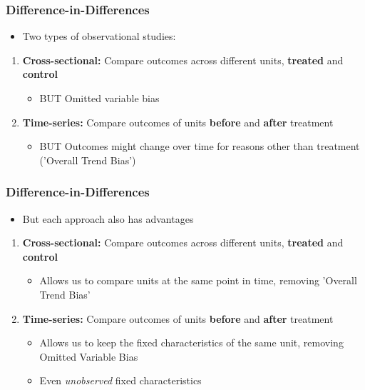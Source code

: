 \documentclass[xcolor=x11names,compress]{beamer}\usepackage[]{graphicx}\usepackage[]{color}
\renewcommand{\(}{\begin{columns}}
\renewcommand{\)}{\end{columns}}
\newcommand{\<}[1]{\begin{column}{#1}}
\renewcommand{\>}{\end{column}}
\begin{document}
\begin{frame}
\frametitle{Difference-in-Differences}
\begin{itemize}
\item Two types of observational studies:
\end{itemize}
\pause
\begin{enumerate}
\item \textbf{Cross-sectional:} Compare outcomes across different units, \textbf{treated} and \textbf{control}
\pause
\begin{itemize}
\item BUT Omitted variable bias
\end{itemize}
\pause
\item \textbf{Time-series:} Compare outcomes of units \textbf{before} and \textbf{after} treatment
\pause
\begin{itemize}
\item BUT Outcomes might change over time for reasons other than treatment ('Overall Trend Bias')
\end{itemize}
\end{enumerate}
\end{frame}

\begin{frame}
\frametitle{Difference-in-Differences}
\begin{itemize}
\item But each approach also has advantages
\end{itemize}
\pause
\begin{enumerate}
\item \textbf{Cross-sectional:} Compare outcomes across different units, \textbf{treated} and \textbf{control}
\pause
\begin{itemize}
\item Allows us to compare units at the same point in time, removing 'Overall Trend Bias'
\end{itemize}
\pause
\item \textbf{Time-series:} Compare outcomes of units \textbf{before} and \textbf{after} treatment
\pause
\begin{itemize}
\item Allows us to keep the fixed characteristics of the same unit, removing Omitted Variable Bias
\pause
\item Even \textit{unobserved} fixed characteristics
\end{itemize}
\end{enumerate}
\end{frame}
\end{document}
